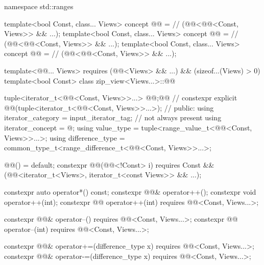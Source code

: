 \begin{codeblock}
namespace std::ranges {
  template<bool Const, class... Views>
    concept @@ =                 // \expos
      (@@<@@<Const, Views>> && ...);
  template<bool Const, class... Views>
    concept @@ =                 // \expos
      (@@<@@<Const, Views>> && ...);
  template<bool Const, class... Views>
    concept @@ =                       // \expos
      (@@<@@<Const, Views>> && ...);

  template<@@... Views>
    requires (@@<Views> && ...) && (sizeof...(Views) > 0)
  template<bool Const>
  class zip_view<Views...>::@@ {
    tuple<iterator_t<@@<Const, Views>>...> @@;@\itcorr[-1]@       // \expos
    constexpr explicit @@(tuple<iterator_t<@@<Const, Views>>...>);
                                                                            // \expos
  public:
    using iterator_category = input_iterator_tag;                           // not always present
    using iterator_concept  = @\seebelow@;
    using value_type = tuple<range_value_t<@@<Const, Views>>...>;
    using difference_type = common_type_t<range_difference_t<@@<Const, Views>>...>;

    @@() = default;
    constexpr @@(@@<!Const> i)
      requires Const && (@@<iterator_t<Views>, iterator_t<const Views>> && ...);

    constexpr auto operator*() const;
    constexpr @@& operator++();
    constexpr void operator++(int);
    constexpr @@ operator++(int) requires @@<Const, Views...>;

    constexpr @@& operator--() requires @@<Const, Views...>;
    constexpr @@ operator--(int) requires @@<Const, Views...>;

    constexpr @@& operator+=(difference_type x)
      requires @@<Const, Views...>;
    constexpr @@& operator-=(difference_type x)
      requires @@<Const, Views...>;

}}
\end{codeblock}
